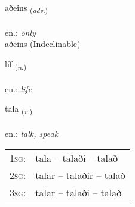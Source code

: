\documentclass[frontgrid, backgrid]{flacards}\usepackage[]{graphicx}\usepackage[]{xcolor}
\begin{document}
{aðeins \small{\textsubscript{(\textit{adv.})}} \\[1ex]
\textphonetic{[aːðeins]} \\
en.: \emph{only} \\  [2ex]
aðeins (Indeclinable)}

\renewcommand{\flhead}{\vskip5pt \fboxsep=0pt {\small\bfseries\footnotesize Nafnorð | Noun}}
\renewcommand{\fcfoot}{\vskip5pt \fboxsep=0pt \hspace{2pt}{\small\bfseries\footnotesize 1K}}

\renewcommand{\blhead}{\vskip5pt {\small\bfseries\footnotesize Nafnorð | Noun }}
\renewcommand{\bcfoot}{\vskip5pt \hspace{2pt}{\small\bfseries\footnotesize 1K}}


{líf \small{\textsubscript{(\textit{n.})}} \\[1ex] %
\textphonetic{[liːv]} \\
en.: \emph{life} \\  [2ex]
\renewcommand*{\arraystretch}{0.8}
}

\renewcommand{\flhead}{\vskip5pt \fboxsep=0pt {\small\bfseries\footnotesize Sagnorð | Verb}}
\renewcommand{\fcfoot}{\vskip5pt \fboxsep=0pt \hspace{2pt}{\small\bfseries\footnotesize 1K}}

\renewcommand{\blhead}{\vskip5pt {\small\bfseries\footnotesize Sagnorð | Verb }}
\renewcommand{\bcfoot}{\vskip5pt \hspace{2pt}{\small\bfseries\footnotesize 1K}}


{tala \small{\textsubscript{(\textit{v.})}} \\[1ex] %
\textphonetic{[tʰaːla]} \\
en.: \emph{talk, speak} \\  [2ex]
\renewcommand*{\arraystretch}{0.8}
\begin{tabular}{p{1cm}l}
\textsc{1sg}: & tala -- talaði -- talað \\ 
\textsc{2sg}: & talar -- talaðir -- talað \\ 
\textsc{3sg}: & talar -- talaði -- talað \\ 
\end{tabular}
}
\end{document}
